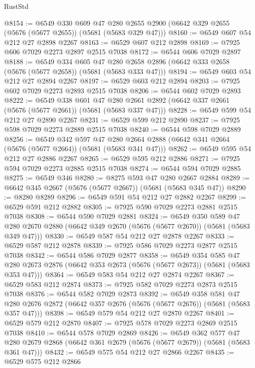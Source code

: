 \begin{lexlean}{RustStd}
\begin{coremodule}
@8154 := @6549
    @330
    @609
    @47
    @280
    @2655
    @2900
    (@6642 @329 @2655 (@5676 (@5677 @2655)) (@5681 (@5683 @329 @47)))
@8160 := @6549 @607 @54 @212 @27 @2898 @2267
@8163 := @6529 @607 @212 @2898
@8169 := @7925 @606 @7029 @2273 @2897 @2515 @7038
@8172 := @6544 @606 @7029 @2897
@8188 := @6549
    @334
    @605
    @47
    @280
    @2658
    @2896
    (@6642 @333 @2658 (@5676 (@5677 @2658)) (@5681 (@5683 @333 @47)))
@8194 := @6549 @603 @54 @212 @27 @2894 @2267
@8197 := @6529 @603 @212 @2894
@8203 := @7925 @602 @7029 @2273 @2893 @2515 @7038
@8206 := @6544 @602 @7029 @2893
@8222 := @6549
    @338
    @601
    @47
    @280
    @2661
    @2892
    (@6642 @337 @2661 (@5676 (@5677 @2661)) (@5681 (@5683 @337 @47)))
@8228 := @6549 @599 @54 @212 @27 @2890 @2267
@8231 := @6529 @599 @212 @2890
@8237 := @7925 @598 @7029 @2273 @2889 @2515 @7038
@8240 := @6544 @598 @7029 @2889
@8256 := @6549
    @342
    @597
    @47
    @280
    @2664
    @2888
    (@6642 @341 @2664 (@5676 (@5677 @2664)) (@5681 (@5683 @341 @47)))
@8262 := @6549 @595 @54 @212 @27 @2886 @2267
@8265 := @6529 @595 @212 @2886
@8271 := @7925 @594 @7029 @2273 @2885 @2515 @7038
@8274 := @6544 @594 @7029 @2885
@8275 := @6549 @346
@8280 := @8275 @593 @47 @280 @2667 @2884
@8289 := @6642 @345 @2667 (@5676 (@5677 @2667)) (@5681 (@5683 @345 @47))
@8290 := @8280 @8289
@8296 := @6549 @591 @54 @212 @27 @2882 @2267
@8299 := @6529 @591 @212 @2882
@8305 := @7925 @590 @7029 @2273 @2881 @2515 @7038
@8308 := @6544 @590 @7029 @2881
@8324 := @6549
    @350
    @589
    @47
    @280
    @2670
    @2880
    (@6642 @349 @2670 (@5676 (@5677 @2670)) (@5681 (@5683 @349 @47)))
@8330 := @6549 @587 @54 @212 @27 @2878 @2267
@8333 := @6529 @587 @212 @2878
@8339 := @7925 @586 @7029 @2273 @2877 @2515 @7038
@8342 := @6544 @586 @7029 @2877
@8358 := @6549
    @354
    @585
    @47
    @280
    @2673
    @2876
    (@6642 @353 @2673 (@5676 (@5677 @2673)) (@5681 (@5683 @353 @47)))
@8364 := @6549 @583 @54 @212 @27 @2874 @2267
@8367 := @6529 @583 @212 @2874
@8373 := @7925 @582 @7029 @2273 @2873 @2515 @7038
@8376 := @6544 @582 @7029 @2873
@8392 := @6549
    @358
    @581
    @47
    @280
    @2676
    @2872
    (@6642 @357 @2676 (@5676 (@5677 @2676)) (@5681 (@5683 @357 @47)))
@8398 := @6549 @579 @54 @212 @27 @2870 @2267
@8401 := @6529 @579 @212 @2870
@8407 := @7925 @578 @7029 @2273 @2869 @2515 @7038
@8410 := @6544 @578 @7029 @2869
@8426 := @6549
    @362
    @577
    @47
    @280
    @2679
    @2868
    (@6642 @361 @2679 (@5676 (@5677 @2679)) (@5681 (@5683 @361 @47)))
@8432 := @6549 @575 @54 @212 @27 @2866 @2267
@8435 := @6529 @575 @212 @2866

\end{coremodule}
\end{lexlean}
